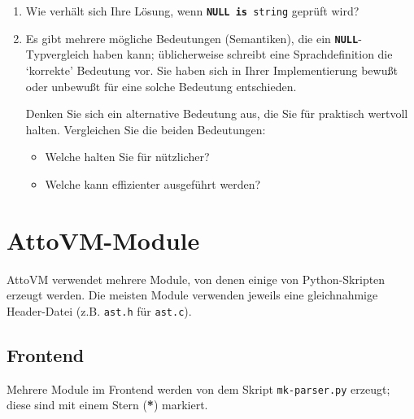 \documentclass[11pt,a4paper]{article}
\newcommand{\Cty}[1]{\textcolor{dblue}{\texttt{#1}}}
\newcommand{\Ckw}[1]{\textbf{\texttt{#1}}}
\begin{document}
\begin{enumerate}
  \item Wie verhält sich Ihre Lösung, wenn \texttt{\Ckw{NULL} \Ckw{is} \Cty{string}} geprüft wird?

  \item Es gibt mehrere mögliche Bedeutungen (Semantiken), die ein \Ckw{NULL}-Typvergleich haben kann; üblicherweise schreibt eine Sprachdefinition
    die `korrekte' Bedeutung vor.  Sie haben sich in Ihrer Implementierung bewußt oder unbewußt für eine solche Bedeutung entschieden.

    Denken Sie sich ein alternative Bedeutung aus, die Sie für praktisch wertvoll halten.  Vergleichen Sie die beiden Bedeutungen:
    \begin{itemize}
      \item Welche halten Sie für nützlicher?
      \item Welche kann effizienter ausgeführt werden?
    \end{itemize}

\end{enumerate}




\appendix

\section{AttoVM-Module}\label{a:modules}

AttoVM verwendet mehrere Module, von denen einige von Python-Skripten erzeugt werden.  Die meisten Module
verwenden jeweils eine gleichnahmige Header-Datei (z.B. \texttt{ast.h} für \texttt{ast.c}).

\subsection{Frontend}

Mehrere Module im Frontend werden von dem Skript \texttt{mk-parser.py} erzeugt; diese sind mit einem  Stern (\textbf{*}) markiert.
\end{document}
